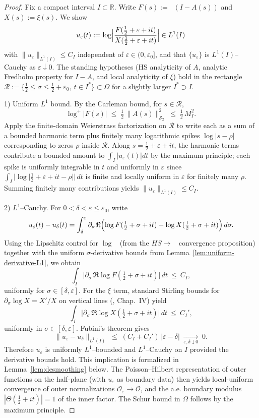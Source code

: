 \documentclass[11pt]{article}
\theoremstyle{definition}
\theoremstyle{remark}
\newcommand{\R}{\mathbb{R}}
\newcommand{\HS}{\mathcal{S}_2}
\DeclareMathOperator{\dettwo}{det_2}
\begin{document}
\begin{proof}
Fix a compact interval $I\subset\R$. Write $F(s):=\dettwo(I-A(s))$ and $X(s):=\xi(s)$. We show
\[
 u_\varepsilon(t):=\log\Bigl|\frac{F(\tfrac12+\varepsilon+it)}{X(\tfrac12+\varepsilon+it)}\Bigr|\in L^1(I)
\]
with $\|u_\varepsilon\|_{L^1(I)}\le C_I$ independent of \(\varepsilon\in(0,\varepsilon_0]\), and that \(\{u_\varepsilon\}\) is $L^1(I)$–Cauchy as \(\varepsilon\downarrow 0\). The standing hypotheses (HS analyticity of $A$, analytic Fredholm property for $I-A$, and local analyticity of \(\xi\)) hold in the rectangle \(\mathcal R:=\{\tfrac12\le\sigma\le\tfrac12+\varepsilon_0,\ t\in I^{\!*}\}\subset\Omega\) for a slightly larger \(I^{\!*}\supset I\).

1) Uniform $L^1$ bound. By the Carleman bound, for \(s\in\mathcal R\),
\[
 \log^+|F(s)|\;\le\;\tfrac12\,\|A(s)\|_{\HS}^2\;\le\;\tfrac12\,M_I^2.
\]
Apply the finite-domain Weierstrass factorization on \(\mathcal R\) to write each as a sum of a bounded harmonic term plus finitely many logarithmic spikes \(\log|s-\rho|\) corresponding to zeros \(\rho\) inside \(\mathcal R\). Along \(s=\tfrac12+\varepsilon+it\), the harmonic terms contribute a bounded amount to \(\int_I |u_\varepsilon(t)|dt\) by the maximum principle; each spike is uniformly integrable in \(t\) and uniformly in \(\varepsilon\) since \(\int_I |\log|\tfrac12+\varepsilon+it-\rho||\,dt\) is finite and locally uniform in \(\varepsilon\) for finitely many \(\rho\). Summing finitely many contributions yields $\|u_\varepsilon\|_{L^1(I)}\le C_I$.

2) $L^1$–Cauchy. For \(0<\delta<\varepsilon\le\varepsilon_0\), write
\[
 u_\varepsilon(t)-u_\delta(t)
 = \int_{\delta}^{\varepsilon} \partial_\sigma \Re\Bigl(\log F(\tfrac12+\sigma+it)-\log X(\tfrac12+\sigma+it)\Bigr)\,d\sigma.
\]
Using the Lipschitz control for \(\log\dettwo\) (from the \(HS\to\dettwo\) convergence proposition) together with the uniform \(\sigma\)-derivative bounds from Lemma~\ref{lem:uniform-derivative-L1}, we obtain
\[
 \int_I\bigl|\partial_\sigma\,\Re\log F(\tfrac12+\sigma+it)\bigr|\,dt\ \le\ C_I,
\]
uniformly for \(\sigma\in[\delta,\varepsilon]\). For the \(\xi\) term, standard Stirling bounds for \(\partial_\sigma\log X= X'/X\) on vertical lines (\cite{TitchmarshZeta}, Chap.~IV) yield
\[
  \int_I\bigl|\partial_\sigma\,\Re\log X(\tfrac12+\sigma+it)\bigr|\,dt\ \le\ C_I',
\]
uniformly in \(\sigma\in[\delta,\varepsilon]\). Fubini's theorem gives
\[
 \|u_\varepsilon-u_\delta\|_{L^1(I)}\;\le\;(C_I+C_I')\,|\varepsilon-\delta|\;\xrightarrow[\varepsilon,\delta\downarrow 0]{}\;0.
\]
Therefore \(u_\varepsilon\) is uniformly $L^1$–bounded and $L^1$–Cauchy on \(I\) provided the derivative bounds hold. This implication is formalized in Lemma~\ref{lem:desmoothing} below. The Poisson–Hilbert representation of outer functions on the half-plane (with \(u_\varepsilon\) as boundary data) then yields local-uniform convergence of outer normalizations \(\mathcal O_\varepsilon\to \mathcal O\), and the a.e. boundary modulus \(|\Theta(\tfrac12+it)|=1\) of the inner factor. The Schur bound in \(\Omega\) follows by the maximum principle.
\end{proof}
\end{document}
